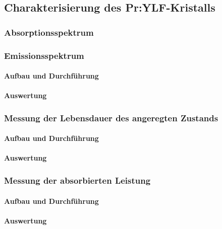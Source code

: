 \subsection{Charakterisierung des Pr:YLF-Kristalls}

\subsubsection{Absorptionsspektrum}



\subsubsection{Emissionsspektrum}

\paragraph{Aufbau und Durchführung}

\paragraph{Auswertung}



\subsubsection{Messung der Lebensdauer des angeregten Zustands}

\paragraph{Aufbau und Durchführung}

\paragraph{Auswertung}



\subsubsection{Messung der absorbierten Leistung}

\paragraph{Aufbau und Durchführung}

\paragraph{Auswertung}
